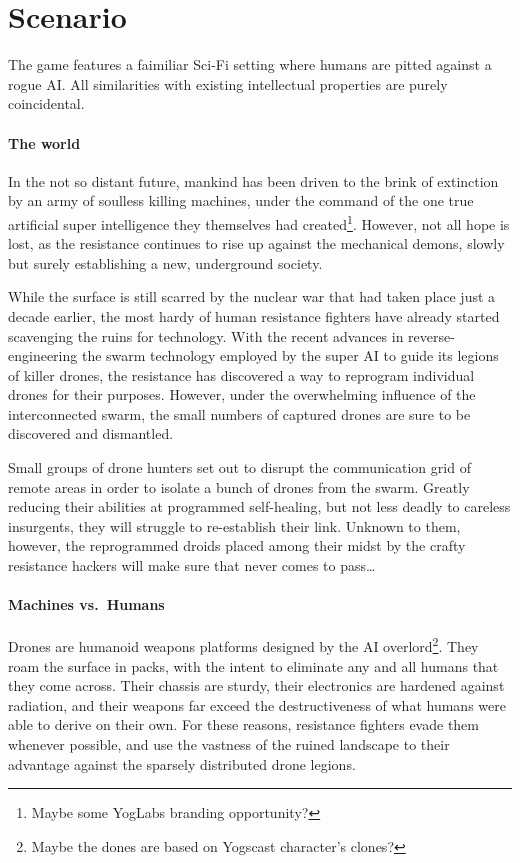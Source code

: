 \chapter{Scenario}

The game features a faimiliar Sci-Fi setting where humans are pitted against a rogue AI.\@
All similarities with existing intellectual properties are purely coincidental.

\subsubsection*{The world}

In the not so distant future, mankind has been driven to the brink of extinction by an army of soulless killing machines, under the command of the one true artificial super intelligence they themselves had created\footnote{Maybe some YogLabs branding opportunity?}.
However, not all hope is lost, as the resistance continues to rise up against the mechanical demons, slowly but surely establishing a new, underground society.

While the surface is still scarred by the nuclear war that had taken place just a decade earlier, the most hardy of human resistance fighters have already started scavenging the ruins for technology.
With the recent advances in reverse-engineering the swarm technology employed by the super AI to guide its legions of killer drones, the resistance has discovered a way to reprogram individual drones for their purposes.
However, under the overwhelming influence of the interconnected swarm, the small numbers of captured drones are sure to be discovered and dismantled.

Small groups of drone hunters set out to disrupt the communication grid of remote areas in order to isolate a bunch of drones from the swarm.
Greatly reducing their abilities at programmed self-healing, but not less deadly to careless insurgents, they will struggle to re-establish their link.
Unknown to them, however, the reprogrammed droids placed among their midst by the crafty resistance hackers will make sure that never comes to pass\ldots{}

\subsubsection*{Machines vs.\ Humans}

Drones are humanoid weapons platforms designed by the AI overlord\footnote{Maybe the dones are based on Yogscast character's clones?}.
They roam the surface in packs, with the intent to eliminate any and all humans that they come across.
Their chassis are sturdy, their electronics are hardened against radiation, and their weapons far exceed the destructiveness of what humans were able to derive on their own.
For these reasons, resistance fighters evade them whenever possible, and use the vastness of the ruined landscape to their advantage against the sparsely distributed drone legions.

